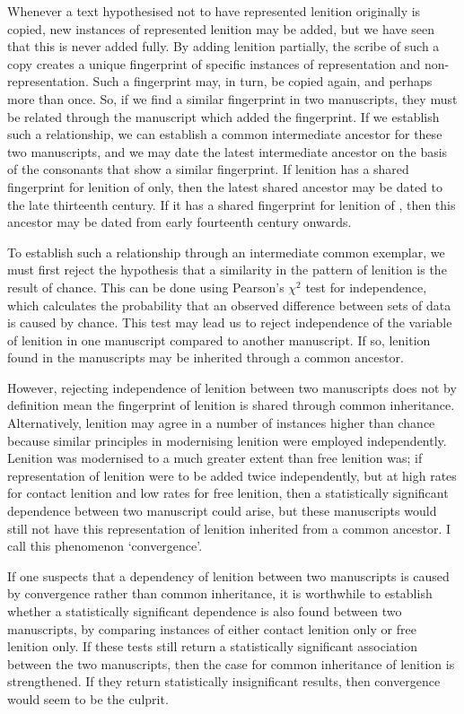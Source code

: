 Whenever a text hypothesised not to have represented lenition originally is copied, new instances of represented lenition may be added, but we have seen that this is never added fully. By adding lenition partially, the scribe of such a copy creates a unique fingerprint of specific instances of representation and non-representation. Such a fingerprint may, in turn, be copied again, and perhaps more than once. So, if we find a similar fingerprint in two manuscripts, they must be related through the manuscript which added the fingerprint. If we establish such a relationship, we can establish a common intermediate ancestor for these two manuscripts, and we may date the latest intermediate ancestor on the basis of the consonants that show a similar fingerprint. If lenition has a shared fingerprint for lenition of  only, then the latest shared ancestor may be dated to the late thirteenth century. If it has a shared fingerprint for lenition of , then this ancestor may be dated from early fourteenth century onwards.

To  establish such a relationship through an intermediate common exemplar, we must first reject the hypothesis that a similarity in the pattern of lenition is the result of chance. This can be done using Pearson's \(\chi^2\) test for independence, which calculates the probability that an observed difference between sets of data is caused by chance. This test may lead us to reject independence of the variable of lenition in one manuscript compared to another manuscript. If so, lenition found in the manuscripts may be inherited through a common ancestor.

However, rejecting independence of lenition between two manuscripts does not by definition mean the fingerprint of lenition is shared through common inheritance. Alternatively, lenition may agree in a number of instances higher than chance because similar principles in modernising lenition were employed independently. Lenition was modernised to a much greater extent than free lenition was; if representation of lenition were to be added twice independently, but at high rates for contact lenition and low rates for free lenition, then a statistically significant dependence between two manuscript could arise, but these manuscripts would still not have this representation of lenition inherited from a common ancestor. I call this phenomenon `convergence'.

If one suspects that a dependency of lenition between two manuscripts is caused by convergence rather than common inheritance, it is worthwhile to establish whether a statistically significant dependence is also found between two manuscripts, by comparing instances of either contact lenition only or free lenition only. If these tests still return a statistically significant association between the two manuscripts, then the case for common inheritance of lenition is strengthened. If they return statistically insignificant results, then convergence would seem to be the culprit.

